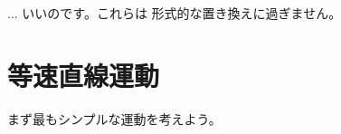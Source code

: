 \begin{faq}{\small{} ... いいのです。これらは
形式的な置き換えに過ぎません。}\end{faq}

\section{等速直線運動}

まず最もシンプルな運動を考えよう。

